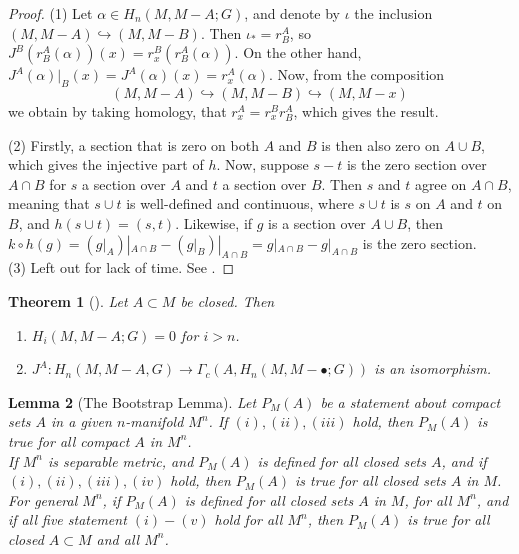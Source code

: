 \documentclass[reqno]{amsart}
\newtheorem{theorem}{Theorem}[section]
\newtheorem{lemma}[theorem]{Lemma}
\theoremstyle{definition}
\theoremstyle{remark}
\begin{document}
\begin{proof}
    (1) Let $\alpha \in 
    H_n(M, M - A;G)$, and denote by
    $\iota$ the inclusion $(M, M-A) \hookrightarrow (M, M-B)$.
    Then $\iota_* = r_{B}^{A}$, so
    $J^{B} \left( r_{B}^{A} (\alpha) \right) (x)
    = r_{x}^{B}\left( r_{B}^{A} (\alpha) \right) $.
    On the other hand, 
    $J^{A}(\alpha)|_{B}(x) =
    J^{A}(\alpha)(x) = 
    r_x^{A}(\alpha)$.
    Now, from the composition
    \[
        (M, M - A) \hookrightarrow 
        (M, M - B) \hookrightarrow 
        (M, M - x)
    \] 
    we obtain by taking homology, that
    $r_x^{A} = r_x^{B} r_{B}^{A}$, which gives the
    result.\\
    \linebreak
    
    (2) Firstly, a section that is zero on both
    $A$ and $B$ is then also zero on
    $A \cup  B$, which gives the injective part
    of $h$. Now, 
    suppose $s-t$ is the zero section over $A \cap B$ 
    for $s$ a section over $A$ and $t$ a section over $B$.
    Then $s$ and $t$ agree on $A \cap B$, meaning that
    $s \cup t$ is well-defined and continuous, where
    $s \cup t$ is $s$ on $A$ and $t$ on $B$, and
    $h(s \cup t) = (s,t)$. Likewise, if
    $g$ is a section over $A \cup  B$, then
    $k \circ h(g) = \left( g|_{A} \right)|_{A \cap B}
    - \left( g|_{B} \right)|_{A \cap B}
    = g|_{A \cap B} - g|_{A \cap B}$ is the
    zero section.\\
    \linebreak
    (3) 
    Left out for lack of time. See \cite{Bredon}.

\end{proof}


\begin{theorem}[]\label{Thm:OGPAL}
    Let $A \subset M$ be closed. Then
    \begin{enumerate}
        \item $H_i \left( M , M - A; G \right) = 0$ for $i>n$.
        \item $J^{A} \colon H_n (M, M - A, G) \to 
            \Gamma_c (A, 
            H_n\left( M, M - \bullet;G \right) )$ is an isomorphism.
    \end{enumerate}
\end{theorem}



\begin{lemma}[The Bootstrap Lemma]
    Let $P_M (A)$ be a statement about compact sets
    $A$ in a given $n$-manifold $M^{n}$. If
    $(i), (ii), (iii)$ hold, then $P_M(A)$ is true
    for all compact $A$ in $M^{n}$.\\
    If $M^{n}$ is separable metric, and $P_M(A)$ is defined
    for all closed sets $A$, and if 
    $(i), (ii), (iii), (iv)$ hold, then $P_M(A)$ is true
    for all closed sets $A$ in $M$.\\
    For general $M^{n}$, if $P_M(A)$ is defined for all closed
    sets $A$ in $M$, for all $M^{n}$, and if all
    five statement $(i) - (v)$ hold for all $M^{n}$, then
    $P_M(A)$ is true for all closed $A \subset M$ and
    all $M^{n}$.
\end{lemma}
\end{document}
